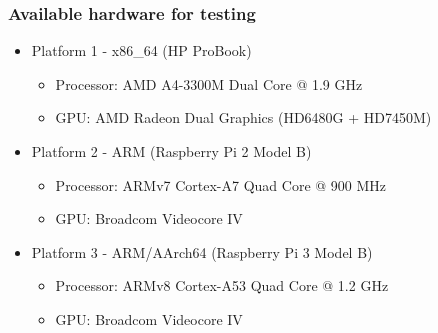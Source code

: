 \documentclass{smilebeamer}
\begin{document}
\begin{frame}
\frametitle{Available hardware for testing}
\begin{itemize}
  \item Platform 1 - x86\_64 (HP ProBook)
  \begin{itemize}
    \item Processor: AMD A4-3300M Dual Core @ 1.9 GHz
    \item GPU: AMD Radeon Dual Graphics (HD6480G + HD7450M)
  \end{itemize}
  \item Platform 2 - ARM (Raspberry Pi 2 Model B)
  \begin{itemize}
    \item Processor: ARMv7 Cortex-A7 Quad Core @ 900 MHz
    \item GPU: Broadcom Videocore IV
  \end{itemize}
  \item Platform 3 - ARM/AArch64 (Raspberry Pi 3 Model B)
  \begin{itemize}
    \item Processor: ARMv8 Cortex-A53 Quad Core @ 1.2 GHz
    \item GPU: Broadcom Videocore IV
  \end{itemize}
\end{itemize}
\end{frame}

\end{document}
